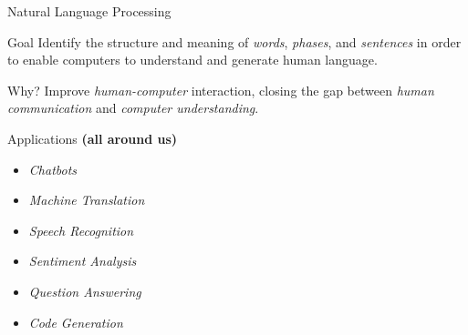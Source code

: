 \documentclass[presentation, 10pt]{beamer}\mode<presentation>{\usetheme{AMSBolognaFC}}
\begin{document}
\begin{frame}{Natural Language Processing}
	\begin{alertblock}{Goal}
		Identify the structure and meaning of \emph{words}, \emph{phases}, and \emph{sentences} in order to enable computers to understand and generate human language.
	\end{alertblock}
	\begin{exampleblock}{Why?}
		Improve \emph{human-computer} interaction, closing the gap between \emph{human communication} and \emph{computer understanding}.
	\end{exampleblock}
	\begin{alertblock}{Applications \textbf{(all around us)}}
		\begin{multicols}{2}
			\begin{itemize}
				\item \emph{Chatbots}
				\item \emph{Machine Translation}
				\item \emph{Speech Recognition}
				\item \emph{Sentiment Analysis}
				\item \emph{Question Answering}
				\item \emph{Code Generation}
			\end{itemize}
		\end{multicols}
	\end{alertblock}
\end{frame}
\end{document}

